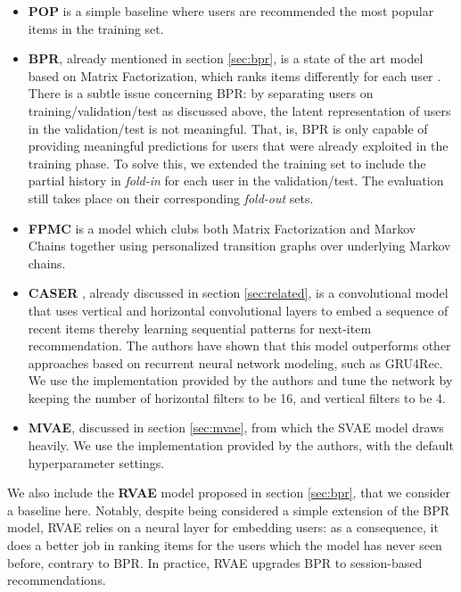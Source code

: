 \documentclass[sigconf]{acmart}
\numberwithin{equation}{section}
\begin{document}
\begin{itemize}
\item \textbf{POP} is a simple baseline where users are recommended
  the most popular items in the training set. 

\item \textbf{BPR}, already mentioned in section \ref{sec:bpr}, is a
  state of the art model based on Matrix
  Factorization, which ranks items
  differently for each user \cite{Rendle:2009}.
There is a subtle
  issue concerning BPR: by separating users on
  training/validation/test as discussed above, the latent
  representation of users in the validation/test is not
  meaningful. That, is, BPR is only capable of providing meaningful
  predictions for users that were already exploited in the training
  phase. To solve this, we extended the training set to include
  the partial history in \textit{fold-in} for each user in the
  validation/test. The evaluation still takes place on their
  corresponding \textit{fold-out} sets. 

\item \textbf{FPMC} \cite{Rendle:2010} is a model which
  clubs both Matrix Factorization and Markov Chains together using
  personalized transition graphs over underlying Markov
  chains.


\item \textbf{CASER} \cite{Tang:2018}, already discussed in section
  \ref{sec:related}, is a convolutional model that uses vertical and
  horizontal convolutional layers to embed a sequence of recent items
  thereby learning sequential patterns for next-item
  recommendation. The authors have shown that this model outperforms
  other approaches based on recurrent neural network modeling, such as
  GRU4Rec. We use the implementation provided by the authors and tune
  the network by keeping the number of horizontal filters to be 16,
  and vertical filters to be 4. 

\item \textbf{MVAE}, discussed in section \ref{sec:mvae}, from which
  the SVAE model draws heavily. We use the implementation provided by
  the authors, with the default hyperparameter settings.

\end{itemize}

We also include the \textbf{RVAE} model proposed in section
\ref{sec:bpr}, that we consider a baseline here. Notably, despite
being considered a simple extension of the BPR
model, RVAE relies on a neural layer for embedding users: as a
consequence,  it does a better job in ranking items for the users which the
model has never seen before, contrary to BPR. In practice, RVAE
upgrades BPR to session-based recommendations. 
\end{document}
